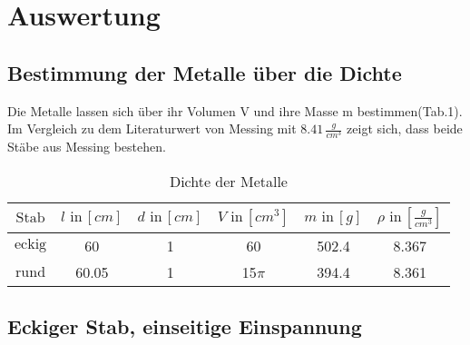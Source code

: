\newpage
\section{Auswertung}
\label{sec:Auswertung}



\subsection{Bestimmung der Metalle über die Dichte}
Die Metalle lassen sich über ihr Volumen V und ihre Masse m bestimmen(Tab.1).
Im Vergleich zu dem Literaturwert von Messing mit $8.41\, \frac{g}{cm^3}$\cite{litval}
zeigt sich, dass beide Stäbe aus Messing bestehen.
\begin{table}[h]
  \centering
  \label{tab:2}
  \begin{tabular}{ c c c c c c }
    \toprule
    {$\text{Stab}$}
   &{$l \,\, \text{in} \, [cm]$}
   &{$d \,\, \text{in} \, [cm]$}
   &{$V \,\, \text{in} \, [cm^3]$}
   &{$m \,\, \text{in} \, [g]$}
   &{$\rho \,\, \text{in} \, [\frac{g}{cm^3}]$} \\
    \midrule
     {$\text{eckig}$}&60&1&60&502.4 & 8.367 \\
     {$\text{rund}$}&60.05&1&15$\pi$&394.4 & 8.361 \\
    \bottomrule
  \end{tabular}
  \caption{Dichte der Metalle}
\end{table}


\subsection{Eckiger Stab, einseitige Einspannung}

